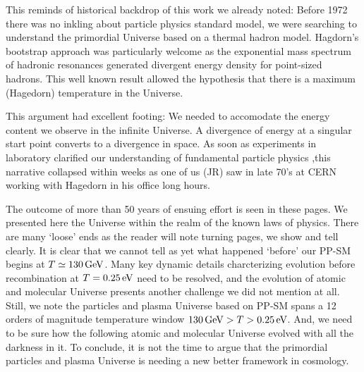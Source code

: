 This reminds of historical backdrop of this work we already noted: Before 1972 there was no inkling about particle physics standard model, we were searching to understand the primordial Universe based on a thermal hadron model. Hagdorn's bootstrap approach was particularly welcome as the exponential mass spectrum of hadronic resonances generated divergent energy density for point-sized hadrons. This well known result allowed the hypothesis that there is a maximum (Hagedorn) temperature in the Universe. 

This argument had excellent footing: We needed to accomodate the energy content we observe in the infinite Universe. A divergence of energy at a singular start point converts to a divergence in space. As soon as experiments in laboratory clarified our understanding of fundamental particle physics ,this narrative collapsed within weeks as one of us  (JR) saw in late 70's at CERN working with Hagedorn in his office long hours. 

The outcome of more than 50 years of ensuing effort is seen in these pages. We presented here  the Universe within the realm of the known laws of physics. There are many `loose' ends as the reader will note turning pages, we show and tell clearly. It is  clear that we cannot tell as yet what happened `before' our PP-SM begins at $T\simeq 130\text{\,GeV}$. Many key dynamic details charcterizing evolution before recombination at $T=0.25\text{\,eV}$ need to be resolved, and the evolution of atomic and molecular Universe presents another challenge we did not mention at all. Still, we note the particles and plasma Universe based on PP-SM spans a 12 orders of magnitude temperature window $  130\text{\,GeV} > T > 0.25\text{\,eV} $. And, we need to be sure how the following atomic and molecular Universe evolved with all the darkness in it. To conclude, it is not the time to argue that the primordial particles and plasma Universe is needing a new better framework in cosmology.   
